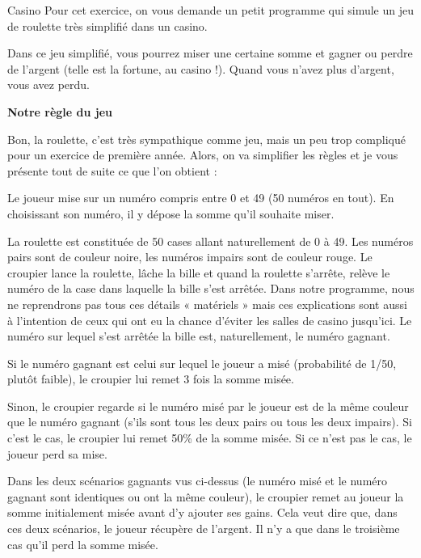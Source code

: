 \begin{Exercice}{Casino}
	Pour cet exercice,
	on vous demande un petit programme qui simule un jeu de roulette
	très simplifié dans un casino.
	
	Dans ce jeu simplifié, vous pourrez miser une certaine somme 
	et gagner ou perdre de l'argent (telle est la fortune, au casino !). 
	Quand vous n'avez plus d'argent, vous avez perdu.

	\textbf{Notre règle du jeu}

	Bon, la roulette, c'est très sympathique comme jeu, 
	mais un peu trop compliqué pour un exercice de première année.
	Alors, on va simplifier les règles et je vous présente tout de suite 
	ce que l'on obtient :
	\begin{liste}
	\item
		Le joueur mise sur un numéro compris entre 0 et 49 (50 numéros en tout). 
		En choisissant son numéro, il y dépose la somme qu'il souhaite miser.
	\item
		La roulette est constituée de 50 cases allant naturellement de 0 à 49. 
		Les numéros pairs sont de couleur noire, 
		les numéros impairs sont de couleur rouge. 
		Le croupier lance la roulette, 
		lâche la bille et quand la roulette s'arrête, 
		relève le numéro de la case dans laquelle la bille s'est arrêtée. 
		Dans notre programme, nous ne reprendrons pas tous ces détails 
		« matériels » mais ces explications sont aussi à l'intention 
		de ceux qui ont eu la chance d'éviter les salles de casino jusqu'ici. 
		Le numéro sur lequel s'est arrêtée la bille est, naturellement, 
		le numéro gagnant.
	\item
		Si le numéro gagnant est celui sur lequel le joueur a misé 
		(probabilité de 1/50, plutôt faible), 
		le croupier lui remet 3 fois la somme misée.
	\item
		Sinon, le croupier regarde si le numéro misé par le joueur 
		est de la même couleur que le numéro gagnant 
		(s'ils sont tous les deux pairs ou tous les deux impairs). 
		Si c'est le cas, le croupier lui remet 50\% de la somme misée. 
		Si ce n'est pas le cas, le joueur perd sa mise.
	\end{liste}
	
	Dans les deux scénarios gagnants vus ci-dessus 
	(le numéro misé et le numéro gagnant sont identiques ou ont la même couleur), 
	le croupier remet au joueur la somme initialement misée avant d'y ajouter ses gains. 
	Cela veut dire que, dans ces deux scénarios, le joueur récupère de l'argent. 
	Il n'y a que dans le troisième cas qu'il perd la somme misée. 
\end{Exercice}
